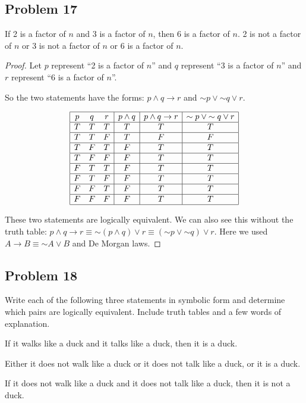 \documentclass[14pt]{extarticle}
\begin{document}
\subsection{Problem 17}
If 2 is a factor of $n$ and 3 is a factor of $n$, then 6 is a factor of $n$. 2
is not a factor of $n$ or 3 is not a factor of $n$ or 6 is a factor of $n$.

\begin{proof}
Let $p$ represent “2 is a factor of $n$” and $q$ represent “3 is a factor of
$n$” and $r$ represent ``6 is a factor of $n$''.

So the two statements have the forms: $p \wedge q \to r$ and ${\sim p} \vee
{\sim q} \vee r$.

$$
\begin{array}{|ccc|c|c|c|}
\hline
p & q & r & p \wedge q & p \wedge q \to r & {\sim p} \vee {\sim q} \vee r \\
\hline
T & T & T & T & T & T \\
\hline
T & T & F & T & F & F \\
\hline
T & F & T & F & T & T \\
\hline
T & F & F & F & T & T \\
\hline
F & T & T & F & T & T \\
\hline
F & T & F & F & T & T \\
\hline
F & F & T & F & T & T \\
\hline
F & F & F & F & T & T \\
\hline
\end{array}
$$

These two statements are logically equivalent. We can also see this without the
truth table: $p \wedge q \to r \equiv {\sim (p \wedge q)} \vee r \equiv ({\sim
p} \vee {\sim q}) \vee r$. Here we used $A \to B \equiv {\sim A} \vee B$ and De
Morgan laws.
\end{proof}

\subsection{Problem 18}
Write each of the following three statements in symbolic form and determine
which pairs are logically equivalent. Include truth tables and a few words of
explanation.

If it walks like a duck and it talks like a duck, then it is a duck.

Either it does not walk like a duck or it does not talk like a duck, or it is a
duck.

If it does not walk like a duck and it does not talk like a duck, then it is not
a duck.
\end{document}
